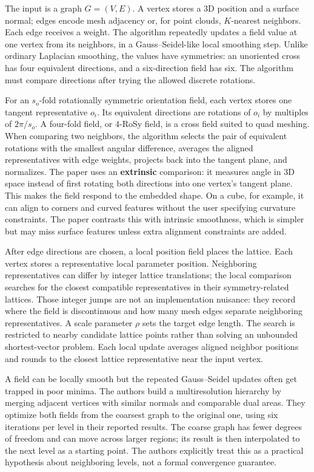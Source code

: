 The input is a graph \(G=(V,E)\). A vertex stores a 3D position and a surface normal; edges encode mesh adjacency or, for point clouds, \(K\)-nearest neighbors. Each edge receives a weight. The algorithm repeatedly updates a field value at one vertex from its neighbors, in a Gauss--Seidel-like local smoothing step. Unlike ordinary Laplacian smoothing, the values have symmetries: an unoriented cross has four equivalent directions, and a six-direction field has six. The algorithm must compare directions after trying the allowed discrete rotations.

For an \(s_o\)-fold rotationally symmetric orientation field, each vertex stores one tangent representative \(o_i\). Its equivalent directions are rotations of \(o_i\) by multiples of \(2\pi/s_o\). A four-fold field, or 4-RoSy field, is a cross field suited to quad meshing. When comparing two neighbors, the algorithm selects the pair of equivalent rotations with the smallest angular difference, averages the aligned representatives with edge weights, projects back into the tangent plane, and normalizes. The paper uses an \textbf{extrinsic} comparison: it measures angle in 3D space instead of first rotating both directions into one vertex's tangent plane. This makes the field respond to the embedded shape. On a cube, for example, it can align to corners and curved features without the user specifying curvature constraints. The paper contrasts this with intrinsic smoothness, which is simpler but may miss surface features unless extra alignment constraints are added.

After edge directions are chosen, a local position field places the lattice. Each vertex stores a representative local parameter position. Neighboring representatives can differ by integer lattice translations; the local comparison searches for the closest compatible representatives in their symmetry-related lattices. Those integer jumps are not an implementation nuisance: they record where the field is discontinuous and how many mesh edges separate neighboring representatives. A scale parameter \(\rho\) sets the target edge length. The search is restricted to nearby candidate lattice points rather than solving an unbounded shortest-vector problem. Each local update averages aligned neighbor positions and rounds to the closest lattice representative near the input vertex.

A field can be locally smooth but the repeated Gauss--Seidel updates often get trapped in poor minima. The authors build a multiresolution hierarchy by merging adjacent vertices with similar normals and comparable dual areas. They optimize both fields from the coarsest graph to the original one, using six iterations per level in their reported results. The coarse graph has fewer degrees of freedom and can move across larger regions; its result is then interpolated to the next level as a starting point. The authors explicitly treat this as a practical hypothesis about neighboring levels, not a formal convergence guarantee.

